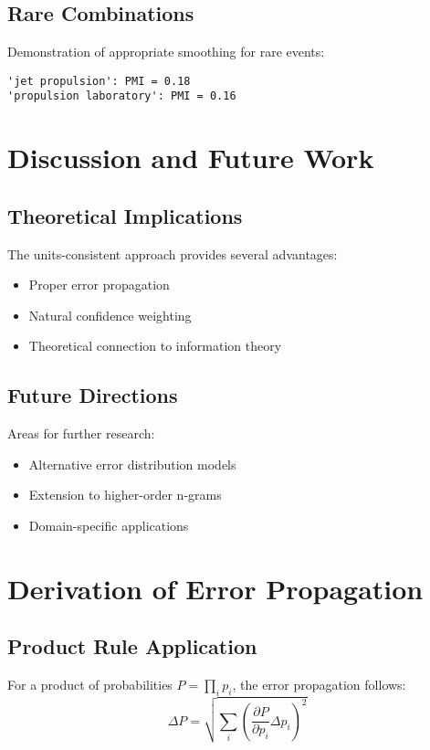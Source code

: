 \documentclass[12pt,a4paper]{article}
\begin{document}
\subsection{Rare Combinations}
Demonstration of appropriate smoothing for rare events:
\begin{verbatim}
'jet propulsion': PMI = 0.18
'propulsion laboratory': PMI = 0.16
\end{verbatim}

\section{Discussion and Future Work}

\subsection{Theoretical Implications}
The units-consistent approach provides several advantages:
\begin{itemize}
    \item Proper error propagation
    \item Natural confidence weighting
    \item Theoretical connection to information theory
\end{itemize}

\subsection{Future Directions}
Areas for further research:
\begin{itemize}
    \item Alternative error distribution models
    \item Extension to higher-order n-grams
    \item Domain-specific applications
\end{itemize}

\appendix
\section{Derivation of Error Propagation}

\subsection{Product Rule Application}
For a product of probabilities $P = \prod_i p_i$, the error propagation follows:
\begin{equation}
    \Delta P = \sqrt{\sum_i \left(\frac{\partial P}{\partial p_i}\Delta p_i\right)^2}
\end{equation}
\end{document}
